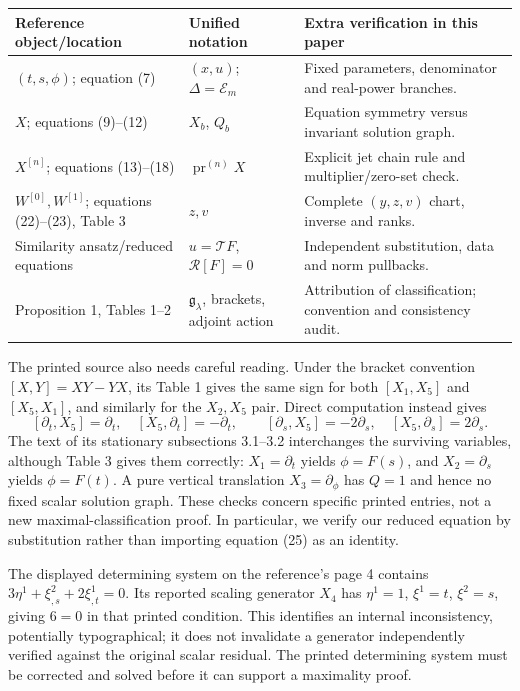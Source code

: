 \documentclass[11pt]{article}
\theoremstyle{definition}
\newcommand{\E}{\mathcal E}
\newcommand{\pr}{\operatorname{pr}}
\begin{document}
\begin{center}\small
\renewcommand{\arraystretch}{1.12}
\begin{tabularx}{\linewidth}{@{}p{3.6cm}p{3.8cm}X@{}}
\toprule
Reference object/location & Unified notation & Extra verification in this paper \\
\midrule
$(t,s,\phi)$; equation (7) & $(x,u)$; $\Delta=\E_m$ & Fixed parameters, denominator and real-power branches. \\
$X$; equations (9)--(12) & $X_b$, $Q_b$ & Equation symmetry versus invariant solution graph. \\
$X^{[n]}$; equations (13)--(18) & $\pr^{(n)}X$ & Explicit jet chain rule and multiplier/zero-set check. \\
$W^{[0]},W^{[1]}$; equations (22)--(23), Table 3 & $z,v$ & Complete $(y,z,v)$ chart, inverse and ranks. \\
Similarity ansatz/reduced equations & $u=\mathcal TF$, $\mathcal R[F]=0$ & Independent substitution, data and norm pullbacks. \\
Proposition 1, Tables 1--2 & $\mathfrak g_\lambda$, brackets, adjoint action & Attribution of classification; convention and consistency audit. \\
\bottomrule
\end{tabularx}
\end{center}

The printed source also needs careful reading. Under the bracket convention
$[X,Y]=XY-YX$, its Table 1 gives the same sign for both
$[X_1,X_5]$ and $[X_5,X_1]$, and similarly for the $X_2,X_5$ pair.
Direct computation instead gives
\[
 [\partial_t,X_5]=\partial_t,\quad [X_5,\partial_t]=-\partial_t,
 \qquad [\partial_s,X_5]=-2\partial_s,\quad
 [X_5,\partial_s]=2\partial_s.
\]
The text of its stationary subsections 3.1--3.2 interchanges the surviving
variables, although Table 3 gives them correctly: $X_1=\partial_t$ yields
$\phi=F(s)$, and $X_2=\partial_s$ yields $\phi=F(t)$.
A pure vertical translation $X_3=\partial_\phi$ has $Q=1$ and hence no
fixed scalar solution graph. These checks concern specific printed entries,
not a new maximal-classification proof. In particular, we verify our reduced
equation by substitution rather than importing equation (25) as an identity.

The displayed determining system on the reference's page 4 contains
$3\eta^1+\xi^2_{,s}+2\xi^1_{,t}=0$. Its reported scaling generator
$X_4$ has $\eta^1=1$, $\xi^1=t$, $\xi^2=s$, giving $6=0$ in that
printed condition. This identifies an internal inconsistency, potentially
typographical; it does not invalidate a generator independently verified
against the original scalar residual. The printed determining system must
be corrected and solved before it can support a maximality proof.
\end{document}

